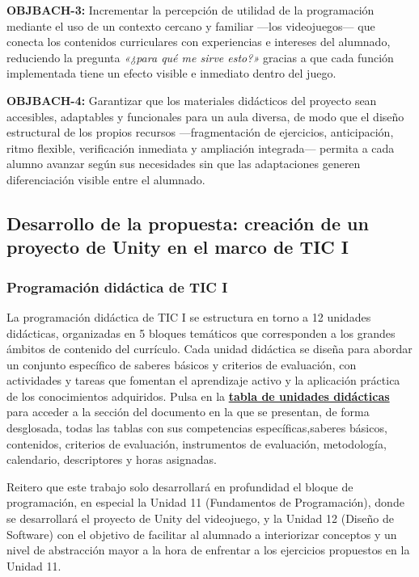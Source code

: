 \documentclass[a4paper,12pt]{article}
\begin{document}
\textbf{OBJBACH-3:} Incrementar la percepción de utilidad de la programación mediante el uso de un contexto cercano y familiar ---los videojuegos--- que conecta los contenidos curriculares con experiencias e intereses del alumnado, reduciendo la pregunta \textit{«¿para qué me sirve esto?»} gracias a que cada función implementada tiene un efecto visible e inmediato dentro del juego.

\textbf{OBJBACH-4:} Garantizar que los materiales didácticos del proyecto sean accesibles, adaptables y funcionales para un aula diversa, de modo que el diseño estructural de los propios recursos ---fragmentación de ejercicios, anticipación, ritmo flexible, verificación inmediata y ampliación integrada--- permita a cada alumno avanzar según sus necesidades sin que las adaptaciones generen diferenciación visible entre el alumnado.


\subsection{Desarrollo de la propuesta: creación de un proyecto de Unity en el marco de TIC I}

\hypertarget{back341}{\subsubsection{Programación didáctica de TIC I}}

La programación didáctica de TIC I se estructura en torno a 12 unidades didácticas, organizadas en 5 bloques temáticos
que corresponden a los grandes ámbitos de contenido del currículo. Cada unidad didáctica se diseña para abordar un conjunto específico
de saberes básicos y criterios de evaluación, con actividades y tareas que fomentan el aprendizaje activo y la aplicación práctica de los
conocimientos adquiridos. Pulsa en la \hyperlink{tablauds}{\textbf{tabla de unidades didácticas}} para acceder a la sección del documento 
en la que se presentan, de forma desglosada, todas las tablas con sus competencias específicas,saberes básicos, contenidos, criterios de 
evaluación, instrumentos de evaluación, metodología, calendario, descriptores y horas asignadas.

Reitero que este trabajo solo desarrollará en profundidad el bloque de programación, en especial la Unidad 11 (Fundamentos de Programación),
donde se desarrollará el proyecto de Unity del videojuego, y la Unidad 12 (Diseño de Software) con el objetivo de facilitar al alumnado a interiorizar conceptos y un nivel de abstracción mayor
a la hora de enfrentar a los ejercicios propuestos en la Unidad 11.
\end{document}
